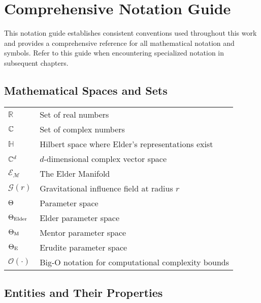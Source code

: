 \chapter*{Comprehensive Notation Guide}

This notation guide establishes consistent conventions used throughout this work and provides a comprehensive reference for all mathematical notation and symbols. Refer to this guide when encountering specialized notation in subsequent chapters.

\section*{Mathematical Spaces and Sets}

\begin{tabular}{p{3cm} p{12cm}}
$\mathbb{R}$ & Set of real numbers \\
$\mathbb{C}$ & Set of complex numbers \\
$\mathbb{H}$ & Hilbert space where Elder's representations exist \\
$\mathbb{C}^{d}$ & $d$-dimensional complex vector space \\
$\mathcal{E}_{\mathcal{M}}$ & The Elder Manifold \\
$\mathcal{G}(r)$ & Gravitational influence field at radius $r$ \\
$\Theta$ & Parameter space \\
$\Theta_{\text{Elder}}$ & Elder parameter space \\
$\Theta_{\text{M}}$ & Mentor parameter space \\
$\Theta_{\text{E}}$ & Erudite parameter space \\
$\mathcal{O}(\cdot)$ & Big-O notation for computational complexity bounds \\
\end{tabular}

\section*{Entities and Their Properties}

